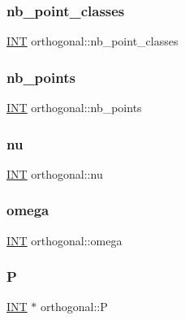 \subsubsection{\texorpdfstring{nb\+\_\+point\+\_\+classes}{nb\_point\_classes}}
{\footnotesize\ttfamily \mbox{\hyperlink{galois_8h_a09fddde158a3a20bd2dcadb609de11dc}{I\+NT}} orthogonal\+::nb\+\_\+point\+\_\+classes}

\mbox{\label{classorthogonal_a6d85028399756136b9bcf944db719e7c}} 
\subsubsection{\texorpdfstring{nb\+\_\+points}{nb\_points}}
{\footnotesize\ttfamily \mbox{\hyperlink{galois_8h_a09fddde158a3a20bd2dcadb609de11dc}{I\+NT}} orthogonal\+::nb\+\_\+points}

\mbox{\label{classorthogonal_a9fe9656b6e027b9ed7455cf7ef7b3d64}} 
\subsubsection{\texorpdfstring{nu}{nu}}
{\footnotesize\ttfamily \mbox{\hyperlink{galois_8h_a09fddde158a3a20bd2dcadb609de11dc}{I\+NT}} orthogonal\+::nu}

\mbox{\label{classorthogonal_a14b827521ee8a9b84cdf73109a0e5540}} 
\subsubsection{\texorpdfstring{omega}{omega}}
{\footnotesize\ttfamily \mbox{\hyperlink{galois_8h_a09fddde158a3a20bd2dcadb609de11dc}{I\+NT}} orthogonal\+::omega}

\mbox{\label{classorthogonal_a39c5b383c5fdabc722eb7f719ba1a45a}} 
\subsubsection{\texorpdfstring{P}{P}}
{\footnotesize\ttfamily \mbox{\hyperlink{galois_8h_a09fddde158a3a20bd2dcadb609de11dc}{I\+NT}} $\ast$ orthogonal\+::P}


